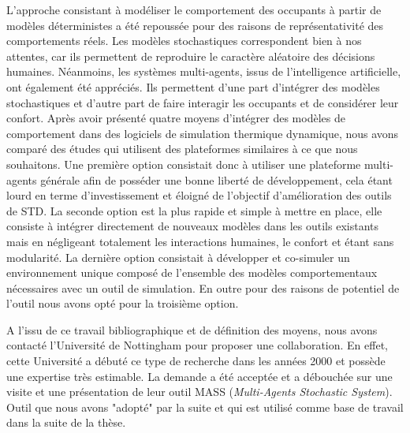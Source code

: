 L'approche consistant à modéliser le comportement des occupants à partir de modèles déterministes a été repoussée pour des raisons de représentativité des comportements réels. Les modèles stochastiques correspondent bien à nos attentes, car ils permettent de reproduire le caractère aléatoire des décisions humaines. Néanmoins, les systèmes multi-agents, issus de l'intelligence artificielle, ont également été appréciés. Ils permettent d'une part d'intégrer des modèles stochastiques et d'autre part de faire interagir les occupants et de considérer leur confort. Après avoir présenté quatre moyens d'intégrer des modèles de comportement dans des logiciels de simulation thermique dynamique, nous avons comparé des études qui utilisent des plateformes similaires à ce que nous souhaitons. Une première option consistait donc à utiliser une plateforme multi-agents générale afin de posséder une bonne liberté de développement, cela étant lourd en terme d'investissement et éloigné de l'objectif d'amélioration des outils de STD. La seconde option est la plus rapide et simple à mettre en place, elle consiste à intégrer directement de nouveaux modèles dans les outils existants mais en négligeant totalement les interactions humaines, le confort et étant sans modularité. La dernière option consistait à développer et co-simuler un environnement unique composé de l'ensemble des modèles comportementaux nécessaires avec un outil de simulation. En outre pour des raisons de potentiel de l'outil nous avons opté pour la troisième option.

A l'issu de ce travail bibliographique et de définition des moyens, nous avons contacté l'Université de Nottingham pour proposer une collaboration. En effet, cette Université a débuté ce type de recherche dans les années 2000 et possède une expertise très estimable. La demande a été acceptée et a débouchée sur une visite et une présentation de leur outil MASS (\textit{Multi-Agents Stochastic System}). Outil que nous avons "adopté" par la suite et qui est utilisé comme base de travail dans la suite de la thèse.
